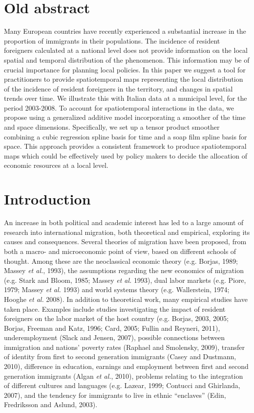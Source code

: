 \section{Old abstract}

Many European countries have recently experienced a substantial increase in the proportion of immigrants in their populations. The incidence of resident foreigners calculated at a national level does not provide information on the local spatial and temporal distribution of the phenomenon. This information may be of crucial importance for planning local policies. In this paper we suggest a tool for practitioners to provide spatiotemporal maps representing the local distribution of the incidence of resident foreigners in the territory, and changes in spatial trends over time. We illustrate this with Italian data at a municipal level, for the period 2003-2008. To account for spatiotemporal interactions in the data, we propose using a generalized additive model incorporating a smoother of the time and space dimensions. Specifically, we set up a tensor product smoother combining a cubic regression spline basis for time and a soap film spline basis for space. This approach provides a consistent framework to produce spatiotemporal maps which could be effectively used by policy makers to decide the allocation of economic resources at a local level.


\section{Introduction \label{IN}}

An increase in both political and academic interest has led to a large amount of research into international migration, both theoretical and empirical, exploring its causes and consequences. Several theories of migration have been proposed, from both a macro- and microeconomic point of view, based on different schools of thought. Among these are the neoclassical economic theory (e.g. Borjas, 1989; Massey \textit{et al.}, 1993), the assumptions regarding the new economics of migration (e.g. Stark and Bloom, 1985; Massey \textit{et al.} 1993), dual labor markets (e.g. Piore, 1979; Massey \textit{et al.} 1993) and world systems theory (e.g. Wallerstein, 1974; Hooghe \textit{et al.} 2008). In addition to theoretical work, many empirical studies have taken place. Examples include studies investigating the impact of resident foreigners on the labor market of the host country (e.g. Borjas, 2003, 2005; Borjas, Freeman and Katz, 1996; Card, 2005; Fullin and Reyneri, 2011), underemployment (Slack and Jensen, 2007), possible connections between immigration and nations' poverty rates (Raphael and Smolensky, 2009), transfer of identity from first to second generation immigrants (Casey and Dustmann, 2010), difference in education, earnings and employment between first and second generation immigrants (Algan \textit{et al.}, 2010), problems relating to the integration of different cultures and languages (e.g. Lazear, 1999; Contucci and Ghirlanda, 2007), and the tendency for immigrants to live in ethnic ``enclaves'' (Edin, Fredriksson and Aslund, 2003). 
  

